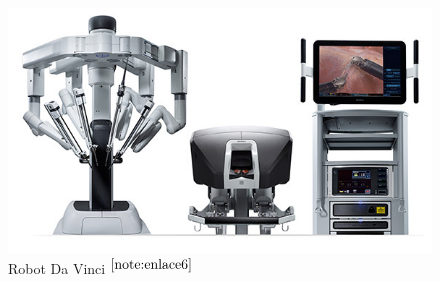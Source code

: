 \begin{figure}[ht!]
	\centering
	\begin{minipage}{0.5\linewidth}
		\centering
		\includegraphics[width=\linewidth]{figs/davincimed.png}
		\caption*{\centering Robot Da Vinci $^{\ref{note:enlace6}}$}
	\end{minipage}
    \hspace{1 cm}
	\begin{minipage}{0.15\linewidth}
		\centering

\end{minipage}
\end{figure}
